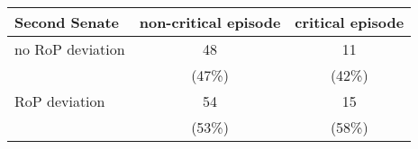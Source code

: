 \begin{table}[ht]
\centering
\begin{tabular}{l|cc}
  \hline
Second Senate & non-critical episode & critical episode \\ 
  \hline
no RoP deviation & 48 & 11 \\ 
   & (47\%) & (42\%) \\ 
  RoP deviation & 54 & 15 \\ 
   & (53\%) & (58\%) \\ 
   \hline
\end{tabular}
\end{table}
